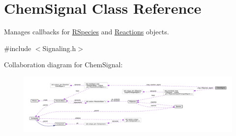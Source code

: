 \hypertarget{classChemSignal}{\section{Chem\+Signal Class Reference}
\label{classChemSignal}
}


Manages callbacks for \hyperlink{classRSpecies}{R\+Species} and \hyperlink{classReaction}{Reactions} objects.  




{\ttfamily \#include $<$Signaling.\+h$>$}



Collaboration diagram for Chem\+Signal\+:\nopagebreak
\begin{figure}[H]
\begin{center}
\leavevmode
\includegraphics[width=350pt]{classChemSignal__coll__graph}
\end{center}
\end{figure}
